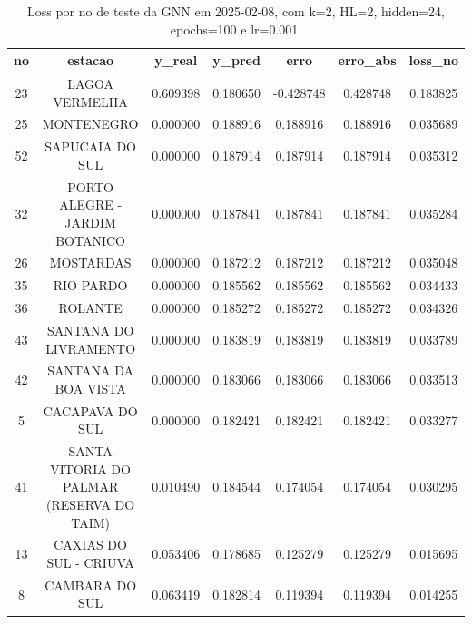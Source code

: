 \begin{table}[h]
\centering
\caption{Loss por no de teste da GNN em 2025-02-08, com k=2, HL=2, hidden=24, epochs=100 e lr=0.001.}
\label{tab:gnn_loss_k2_hl2_h24_e100_d20250208}
\begin{tabular}{ccccccc}
\toprule
no & estacao & y\_real & y\_pred & erro & erro\_abs & loss\_no \\
\midrule
23 & LAGOA VERMELHA & 0.609398 & 0.180650 & -0.428748 & 0.428748 & 0.183825 \\
25 & MONTENEGRO & 0.000000 & 0.188916 & 0.188916 & 0.188916 & 0.035689 \\
52 & SAPUCAIA DO SUL & 0.000000 & 0.187914 & 0.187914 & 0.187914 & 0.035312 \\
32 & PORTO ALEGRE - JARDIM BOTANICO & 0.000000 & 0.187841 & 0.187841 & 0.187841 & 0.035284 \\
26 & MOSTARDAS & 0.000000 & 0.187212 & 0.187212 & 0.187212 & 0.035048 \\
35 & RIO PARDO & 0.000000 & 0.185562 & 0.185562 & 0.185562 & 0.034433 \\
36 & ROLANTE & 0.000000 & 0.185272 & 0.185272 & 0.185272 & 0.034326 \\
43 & SANTANA DO LIVRAMENTO & 0.000000 & 0.183819 & 0.183819 & 0.183819 & 0.033789 \\
42 & SANTANA DA BOA VISTA & 0.000000 & 0.183066 & 0.183066 & 0.183066 & 0.033513 \\
5 & CACAPAVA DO SUL & 0.000000 & 0.182421 & 0.182421 & 0.182421 & 0.033277 \\
41 & SANTA VITORIA DO PALMAR (RESERVA DO TAIM) & 0.010490 & 0.184544 & 0.174054 & 0.174054 & 0.030295 \\
13 & CAXIAS DO SUL - CRIUVA & 0.053406 & 0.178685 & 0.125279 & 0.125279 & 0.015695 \\
8 & CAMBARA DO SUL & 0.063419 & 0.182814 & 0.119394 & 0.119394 & 0.014255 \\
\bottomrule
\end{tabular}
\end{table}
